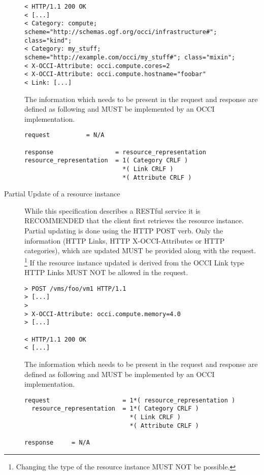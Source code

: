 \documentclass[10pt,a4paper]{article}
\begin{document}
\begin{description}
\begin{verbatim}
< HTTP/1.1 200 OK
< [...]
< Category: compute; scheme="http://schemas.ogf.org/occi/infrastructure#"; class="kind";
< Category: my_stuff; scheme="http://example.com/occi/my_stuff#"; class="mixin";
< X-OCCI-Attribute: occi.compute.cores=2
< X-OCCI-Attribute: occi.compute.hostname="foobar"
< Link: [...]
\end{verbatim}

    The information which needs to be present in the request and
    response are defined as following and MUST be implemented by an
    OCCI implementation.

\begin{verbatim}
request          = N/A

response                 = resource_representation
resource_representation  = 1( Category CRLF )
                           *( Link CRLF )
                           *( Attribute CRLF )
\end{verbatim}

  \item[Partial Update of a resource instance] While this
    specification describes a RESTful service it is RECOMMENDED that
    the client first retrieves the resource instance. Partial updating
    is done using the HTTP POST verb. Only the information (HTTP
    Links, HTTP X-OCCI-Attributes or HTTP categories), which are
    updated MUST be provided along with the
    request. \footnote{Changing the type of the resource instance MUST
      NOT be possible.} If the resource instance updated is derived
    from the OCCI Link type HTTP Links MUST NOT be allowed in the
    request.

\begin{verbatim}
> POST /vms/foo/vm1 HTTP/1.1
> [...]
> 
> X-OCCI-Attribute: occi.compute.memory=4.0
> [...]
 
< HTTP/1.1 200 OK
< [...]
\end{verbatim}

    The information which needs to be present in the request and
    response are defined as following and MUST be implemented by an
    OCCI implementation.

\begin{verbatim}
request                    = 1*( resource_representation )
  resource_representation  = 1*( Category CRLF )
                             *( Link CRLF )
                             *( Attribute CRLF )

response     = N/A

\end{verbatim}
    

\end{description}
\end{document}
